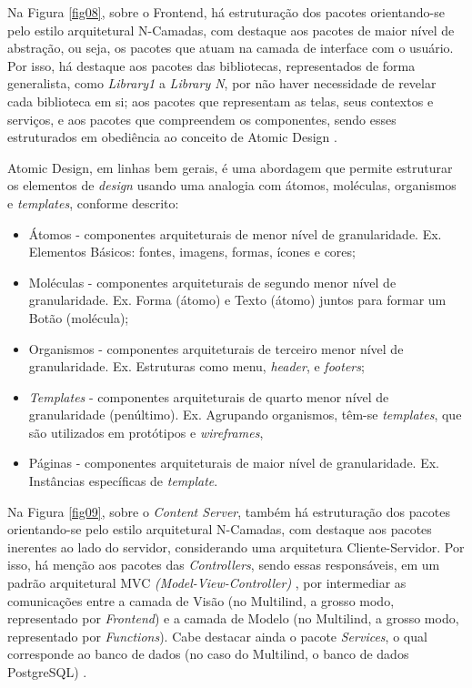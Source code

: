 Na Figura \ref{fig08}, sobre o Frontend, há estruturação dos pacotes orientando-se pelo estilo arquitetural N-Camadas, com destaque aos pacotes de maior nível de abstração, ou seja, os pacotes que atuam na camada de interface com o usuário. Por isso, há destaque aos pacotes das bibliotecas, representados de forma generalista, 
como \textit{Library1} a \textit{Library N}, por não haver necessidade de revelar cada biblioteca em si; aos pacotes que representam as telas, seus contextos e serviços, e aos pacotes que compreendem os componentes, sendo esses estruturados em obediência ao conceito de Atomic Design \cite{atomic}. 

Atomic Design, em linhas bem gerais, é uma abordagem que permite estruturar os elementos de \textit{design} usando uma analogia com átomos, moléculas, organismos e \textit{templates}, conforme descrito:

\begin{itemize}
	\item Átomos - componentes arquiteturais de menor nível de granularidade. Ex. Elementos Básicos: fontes, imagens, formas, ícones e cores;
	\item Moléculas - componentes arquiteturais de segundo menor nível de granularidade. Ex. Forma (átomo) e Texto (átomo) juntos para formar um Botão (molécula);
	\item Organismos - componentes arquiteturais de terceiro menor nível de granularidade. Ex. Estruturas como menu, \textit{header}, e \textit{footers};
	\item \textit{Templates} - componentes arquiteturais de quarto menor nível de granularidade (penúltimo). Ex. Agrupando organismos, têm-se \textit{templates}, que são utilizados em protótipos e \textit{wireframes}, 
	\item Páginas - componentes arquiteturais de maior nível de granularidade. Ex. Instâncias específicas de \textit{template}.
\end{itemize}

Na Figura \ref{fig09}, sobre o \textit{Content Server}, também há estruturação dos pacotes orientando-se pelo estilo arquitetural N-Camadas, com destaque aos pacotes inerentes ao lado do servidor, considerando uma arquitetura Cliente-Servidor. Por isso, há menção aos pacotes das \textit{Controllers}, sendo essas responsáveis, em um padrão 
arquitetural MVC \textit{(Model-View-Controller)} \cite{designpattern}, por intermediar as comunicações entre a camada de Visão (no Multilind, a grosso modo, representado por \textit{Frontend}) e a camada de Modelo (no Multilind, a grosso modo, representado por \textit{Functions}). Cabe destacar ainda o pacote \textit{Services}, o qual corresponde ao banco 
de dados (no caso do Multilind, o banco de dados PostgreSQL) \cite{larman2004}.

